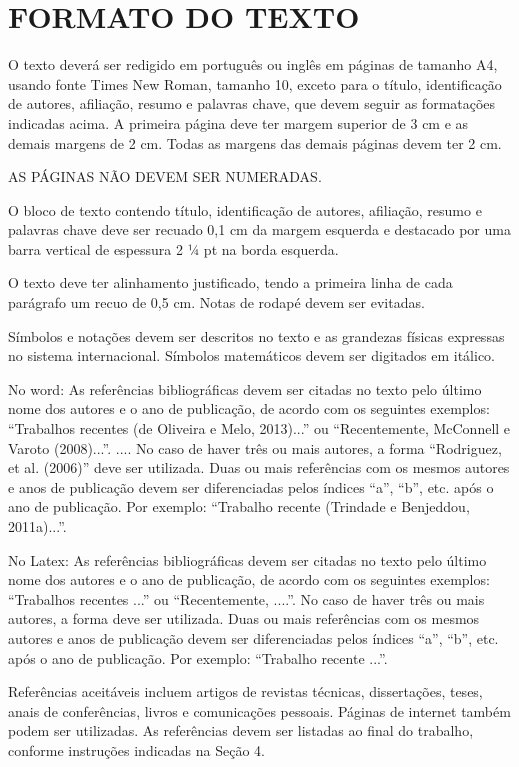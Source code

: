 \documentclass[10pt,fleqn,a4paper,twoside]{article}
\begin{document}
\section{FORMATO DO TEXTO}

O texto deverá ser redigido em português ou inglês em páginas de tamanho A4, usando fonte Times New Roman, tamanho 10, exceto para o título, identificação de autores, afiliação, resumo e palavras chave, que devem seguir as formatações indicadas acima. A primeira página deve ter margem superior de 3 cm e as demais margens de 2 cm. Todas as margens das demais páginas devem ter 2 cm.

AS PÁGINAS NÃO DEVEM SER NUMERADAS.

O bloco de texto contendo título, identificação de autores, afiliação, resumo e palavras chave deve ser recuado 0,1 cm da margem esquerda e destacado por uma barra vertical de espessura 2 ¼ pt na borda esquerda.

O texto deve ter alinhamento justificado, tendo a primeira linha de cada parágrafo um recuo de 0,5 cm. Notas de rodapé devem ser evitadas.

Símbolos e notações devem ser descritos no texto e as grandezas físicas expressas no sistema internacional. Símbolos matemáticos devem ser digitados em itálico.

No word: As referências bibliográficas devem ser citadas no texto pelo último nome dos autores e o ano de publicação, de acordo com os seguintes exemplos: “Trabalhos recentes (de Oliveira e Melo, 2013)...” ou “Recentemente, McConnell e Varoto (2008)...”. .... No caso de haver três ou mais autores, a forma “Rodriguez, et al. (2006)” deve ser utilizada. Duas ou mais referências com os mesmos autores e anos de publicação devem ser diferenciadas pelos índices “a”, “b”, etc. após o ano de publicação. Por exemplo: “Trabalho recente (Trindade e Benjeddou, 2011a)...”.

No Latex: As referências bibliográficas devem ser citadas no texto pelo último nome dos autores e o ano de publicação, de acordo com os seguintes exemplos: “Trabalhos recentes \citep{Ref1}...” ou “Recentemente, \cite{Ref1}....”. No caso de haver três ou mais autores, a forma \cite{livro1} deve ser utilizada. 
Duas ou mais referências com os mesmos autores e anos de publicação devem ser diferenciadas pelos índices “a”, “b”, etc. após o ano de publicação. Por exemplo: “Trabalho recente \citep{Ref2}...”.
 \nocite{Ref3}

Referências aceitáveis incluem artigos de revistas técnicas, dissertações, teses, anais de conferências, livros e comunicações pessoais. Páginas de internet também podem ser utilizadas.
As referências devem ser listadas ao final do trabalho, conforme instruções indicadas na Seção 4.
\end{document}
